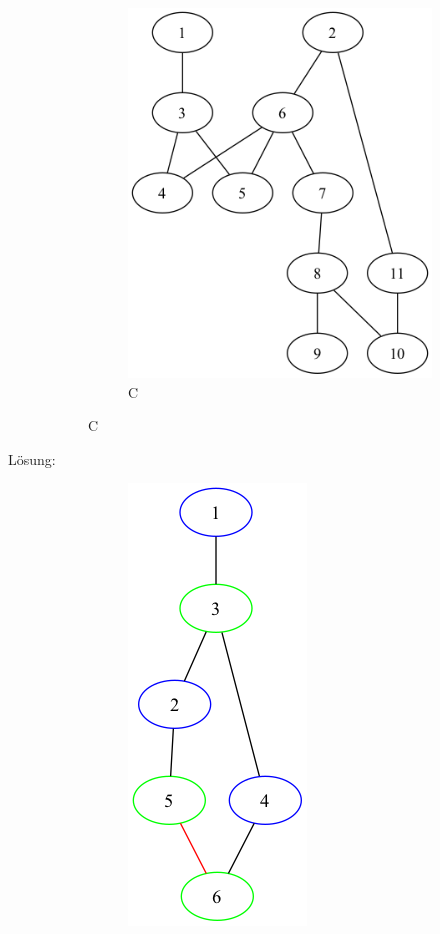 \documentclass[a4paper,11pt]{report}
\begin{document}
\begin{description}
\begin{figure}[htbp]
\begin{subfigure}[b]{0.3\textwidth}
                \includegraphics[height=0.2\textheight]{notebooks/assets/aufgabe_01/C.png}
                \caption{C}
                \label{fig:a01_c}
            \end{subfigure}
            \hfill
        \end{figure}
        \item[Lösung:] \hfill \newline %
        \begin{figure}[htbp]
            \centering
            \begin{subfigure}[b]{0.3\textwidth}
                \includegraphics[height=0.2\textheight]{notebooks/assets/aufgabe_01/A_colored.png}

\end{subfigure}
\end{figure}
\end{description}
\end{document}
